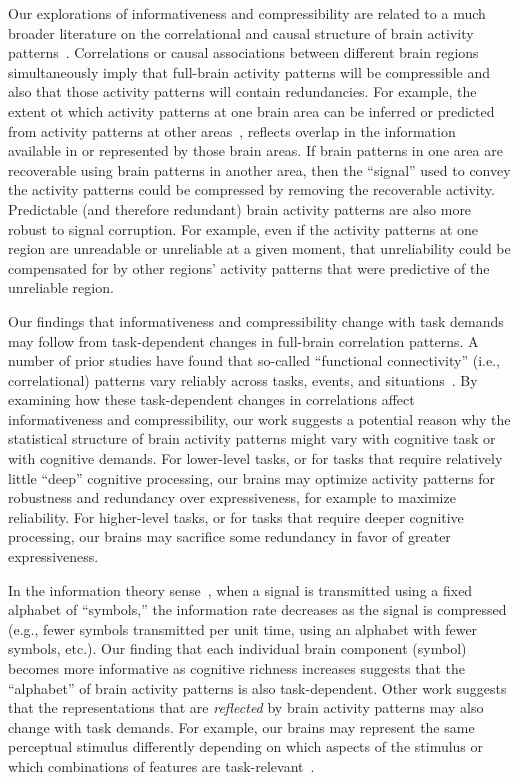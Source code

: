 \documentclass[english, 11pt]{article}
\begin{document}
Our explorations of informativeness and compressibility are related to a much
broader literature on the correlational and causal structure of brain activity
patterns~\citep{PretEtal17, OwenEtal21, RogeEtal07, RubiSpor10, SizeEtal18,
SmitEtal13b, SmitEtal13c, SrinEtal07, TomaVolk11, YeoEtal11, AdacEtal12,
BassSpor17, BullSpor09, SporHone06, SporBetz16, SporZwi04, DhamEtal08,
KorzEtal08, BrovEtal04}. Correlations or causal associations between different
brain regions simultaneously imply that full-brain activity patterns will be
compressible and also that those activity patterns will contain redundancies.
For example, the extent ot which activity patterns at one brain area can be
inferred or predicted from activity patterns at other
areas~\citep[e.g.,][]{OwenEtal20, ScanEtal21}, reflects overlap in the
information available in or represented by those brain areas. If brain patterns
in one area are recoverable using brain patterns in another area, then the
``signal'' used to convey the activity patterns could be compressed by removing
the recoverable activity. Predictable (and therefore redundant) brain activity
patterns are also more robust to signal corruption. For example, even if the
activity patterns at one region are unreadable or unreliable at a given moment,
that unreliability could be compensated for by other regions' activity patterns
that were predictive of the unreliable region.

Our findings that informativeness and compressibility change with task demands
may follow from task-dependent changes in full-brain correlation patterns. A
number of prior studies have found that so-called ``functional connectivity''
(i.e., correlational) patterns vary reliably across tasks, events, and
situations~\citep{SimoEtal16, ColeEtal14, SmitEtal09, OwenEtal21}. By examining
how these task-dependent changes in correlations affect informativeness and
compressibility, our work suggests a potential reason why the statistical
structure of brain activity patterns might vary with cognitive task or with
cognitive demands. For lower-level tasks, or for tasks that require relatively
little ``deep'' cognitive processing, our brains may optimize activity patterns
for robustness and redundancy over expressiveness, for example to maximize
reliability. For higher-level tasks, or for tasks that require deeper cognitive
processing, our brains may sacrifice some redundancy in favor of greater
expressiveness.

In the information theory sense~\citep{Shan48}, when a signal is transmitted
using a fixed alphabet of ``symbols,'' the information rate decreases as the
signal is compressed (e.g., fewer symbols transmitted per unit time, using an
alphabet with fewer symbols, etc.). Our finding that each individual brain
component (symbol) becomes more informative as cognitive richness increases
suggests that the ``alphabet'' of brain activity patterns is also
task-dependent. Other work suggests that the representations that are
\textit{reflected} by brain activity patterns may also change with task
demands. For example, our brains may represent the same perceptual stimulus
differently depending on which aspects of the stimulus or which combinations of
features are task-relevant~\citep{MackEtal20}.
\end{document}

